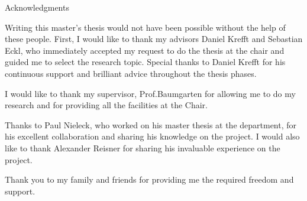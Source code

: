 \thispagestyle{empty}

\vspace*{20mm}

\begin{center}
{ Acknowledgments}
\end{center}

\vspace{10mm}


Writing this master's thesis would not have been possible without the help of these people. 
First, I would like to thank my advisors Daniel Krefft and Sebastian Eckl, who immediately accepted my request to do the thesis at the chair and guided me to select the research topic. Special thanks to Daniel Krefft for his continuous support and brilliant advice throughout the thesis phases.


I would like to thank my supervisor, Prof.Baumgarten for allowing me to do my research and for providing all the facilities at the Chair. 

Thanks to Paul Nieleck, who worked on his master thesis at the department, for his excellent collaboration and sharing his knowledge on the project. I would also like to thank Alexander Reisner for sharing his invaluable experience on the project. 

Thank you to my family and friends for providing me the required freedom and support.

\cleardoublepage{}
